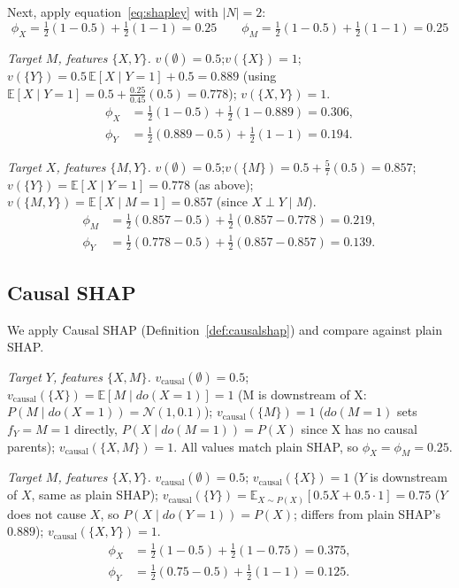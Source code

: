 Next, apply equation~\eqref{eq:shapley} with $|N|=2$:
\begin{equation}
\phi_X = \tfrac{1}{2}(1 - 0.5) + \tfrac{1}{2}(1 - 1) = 0.25
\qquad
\phi_M = \tfrac{1}{2}(1 - 0.5) + \tfrac{1}{2}(1 - 1) = 0.25
\end{equation}

\textit{Target $M$, features $\{X,Y\}$.}
$v(\emptyset)=0.5$;\enspace $v(\{X\})=1$;\enspace
$v(\{Y\})=0.5\,\mathbb{E}[X\mid Y{=}1]+0.5=0.889$
(using $\mathbb{E}[X\mid Y{=}1]=0.5+\tfrac{0.25}{0.45}(0.5)=0.778$);\enspace
$v(\{X,Y\})=1$.
\begin{align}
\phi_X &= \tfrac{1}{2}(1-0.5)+\tfrac{1}{2}(1-0.889)=0.306, \\
\phi_Y &= \tfrac{1}{2}(0.889-0.5)+\tfrac{1}{2}(1-1)=0.194.
\end{align}

\textit{Target $X$, features $\{M,Y\}$.}
$v(\emptyset)=0.5$;\enspace $v(\{M\})=0.5+\tfrac{5}{7}(0.5)=0.857$;\enspace
$v(\{Y\})=\mathbb{E}[X\mid Y{=}1]=0.778$ (as above);\enspace
$v(\{M,Y\})=\mathbb{E}[X\mid M{=}1]=0.857$ (since $X\perp Y\mid M$).
\begin{align}
\phi_M &= \tfrac{1}{2}(0.857-0.5)+\tfrac{1}{2}(0.857-0.778)=0.219, \\
\phi_Y &= \tfrac{1}{2}(0.778-0.5)+\tfrac{1}{2}(0.857-0.857)=0.139.
\end{align}

\subsection{Causal SHAP}\label{app:signal_causal}

We apply Causal SHAP (Definition~\ref{def:causalshap}) and compare against
plain SHAP.

\textit{Target $Y$, features $\{X,M\}$.}
$v_{\mathrm{causal}}(\emptyset)=0.5$;\enspace
$v_{\mathrm{causal}}(\{X\})=\mathbb{E}[M\mid do(X{=}1)]=1$
(M is downstream of X: $P(M\mid do(X{=}1))=\mathcal{N}(1,0.1)$);\enspace
$v_{\mathrm{causal}}(\{M\})=1$ ($do(M{=}1)$ sets $f_Y=M=1$ directly,
$P(X\mid do(M{=}1))=P(X)$ since X has no causal parents);\enspace
$v_{\mathrm{causal}}(\{X,M\})=1$.
All values match plain SHAP, so $\phi_X=\phi_M=0.25$.

\textit{Target $M$, features $\{X,Y\}$.}
$v_{\mathrm{causal}}(\emptyset)=0.5$;\enspace
$v_{\mathrm{causal}}(\{X\})=1$ ($Y$ is downstream of $X$, same as plain SHAP);\enspace
$v_{\mathrm{causal}}(\{Y\})=\mathbb{E}_{X\sim P(X)}[0.5X+0.5{\cdot}1]=0.75$
($Y$ does not cause $X$, so $P(X\mid do(Y{=}1))=P(X)$;
differs from plain SHAP's $0.889$);\enspace
$v_{\mathrm{causal}}(\{X,Y\})=1$.
\begin{align}
\phi_X &= \tfrac{1}{2}(1-0.5)+\tfrac{1}{2}(1-0.75)=0.375, \\
\phi_Y &= \tfrac{1}{2}(0.75-0.5)+\tfrac{1}{2}(1-1)=0.125.
\end{align}

